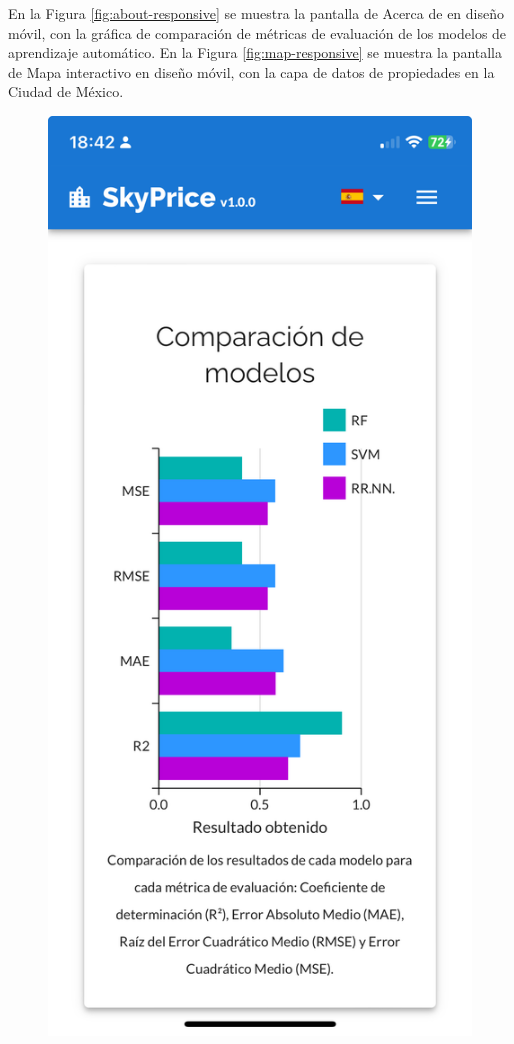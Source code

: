 En la Figura \ref{fig:about-responsive} se muestra la pantalla de Acerca de en
diseño móvil, con la gráfica de comparación de métricas de evaluación de los
modelos de aprendizaje automático. En la Figura \ref{fig:map-responsive} se
muestra la pantalla de Mapa interactivo en diseño móvil, con la capa de datos
de propiedades en la Ciudad de México.

\begin{figure}[H]
    \centering
    \begin{minipage}{0.45\textwidth}
        \centering
        \includegraphics[width=\textwidth]{imagenes/05-implementacion/interfaz-grafica/modelos-responsive.jpeg}

\end{minipage}
\end{figure}
